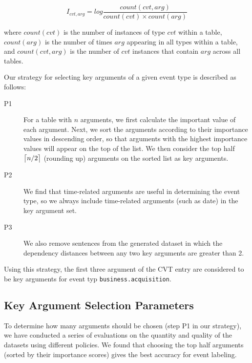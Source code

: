 \begin{equation}
	I_{cvt, arg} = log \frac{count(cvt, arg)}{count(cvt) \times count(arg)}
\end{equation}


where $count(cvt)$ is the number of instances of type $cvt$ within a \CVT table, $count(arg)$ is the number of times $arg$ appearing in all
\CVT types within a \CVT table, and $count(cvt, arg)$ is the number of $cvt$ instances that contain $arg$ across all \CVT tables.


Our strategy for selecting key arguments of a given event type is described as follows:

\begin{description}

\item [P1] For a \CVT table with $n$ arguments, we first calculate the important value of each argument. Next, we sort the arguments
    according to their importance values in descending order, so that arguments with the highest importance values will appear on the top
    of the list. We then consider the top half $\ceil[\big]{n/2}$ (rounding up) arguments on the sorted list as key arguments.

\item [P2] We find that time-related arguments are useful in determining the event type, so we always include time-related arguments
    (such as date) in the key argument set.

\item [P3] We also remove sentences from the generated dataset in which the dependency distances between any two key arguments are
    greater than 2.

\end{description}

Using this strategy, the first three argument of the CVT entry are considered to be key arguments for event typ
\texttt{business.acquisition}. 


\subsection{Key Argument Selection Parameters}
To determine how many arguments should be chosen (step P1 in our strategy), we have conducted a series of evaluations on the quantity and
quality of the datasets using different policies. We found that choosing the top half arguments (sorted by their importance scores) gives
the best accuracy for event labeling.

